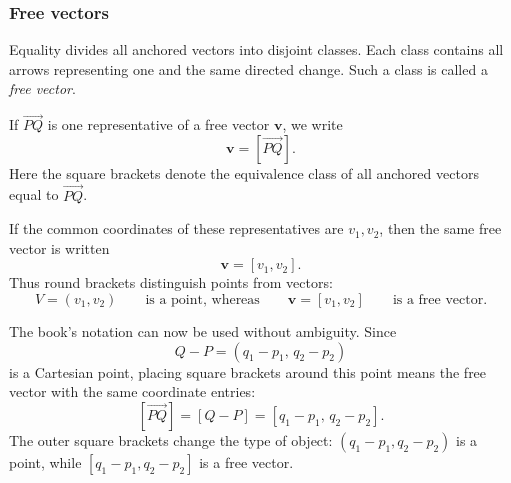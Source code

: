 \begin{center}
\end{center}

\subsubsection*{Free vectors}

Equality divides all anchored vectors into disjoint classes. Each class contains
all arrows representing one and the same directed change. Such a class is called
a \emph{free vector}.

If $\overrightarrow{PQ}$ is one representative of a free vector $\mathbf v$, we
write
\[
\boxed{
\mathbf v=[\overrightarrow{PQ}]
}.
\]
Here the square brackets denote the equivalence class of all anchored vectors
equal to $\overrightarrow{PQ}$.

If the common coordinates of these representatives are $v_1,v_2$, then the same
free vector is written
\[
\boxed{
\mathbf v=[v_1,v_2]
}.
\]
Thus round brackets distinguish points from vectors:
\[
V=(v_1,v_2)
\qquad\text{is a point, whereas}\qquad
\mathbf v=[v_1,v_2]
\qquad\text{is a free vector}.
\]

The book's notation can now be used without ambiguity. Since
\[
Q-P=(q_1-p_1,\,q_2-p_2)
\]
is a Cartesian point, placing square brackets around this point means the free
vector with the same coordinate entries:
\[
\boxed{
[\overrightarrow{PQ}]
=
[Q-P]
=
[q_1-p_1,\,q_2-p_2]
}.
\]
The outer square brackets change the type of object: $(q_1-p_1,q_2-p_2)$ is a
point, while $[q_1-p_1,q_2-p_2]$ is a free vector.

